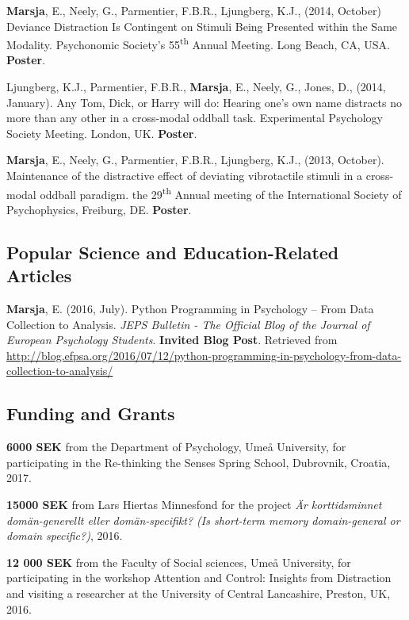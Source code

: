 \documentclass[]{article}
\begin{document}
\textbf{Marsja}, E., Neely, G., Parmentier, F.B.R., Ljungberg, K.J.,
(2014, October) Deviance Distraction Is Contingent on Stimuli Being
Presented within the Same Modality. Psychonomic Society's
55\textsuperscript{th} Annual Meeting. Long Beach, CA, USA.
\textbf{Poster}.

Ljungberg, K.J., Parmentier, F.B.R., \textbf{Marsja}, E., Neely, G.,
Jones, D., (2014, January). Any Tom, Dick, or Harry will do: Hearing
one's own name distracts no more than any other in a cross-modal oddball
task. Experimental Psychology Society Meeting. London, UK.
\textbf{Poster}.

\textbf{Marsja}, E., Neely, G., Parmentier, F.B.R., Ljungberg, K.J.,
(2013, October). Maintenance of the distractive effect of deviating
vibrotactile stimuli in a cross-modal oddball paradigm. the
29\textsuperscript{th} Annual meeting of the International Society of
Psychophysics, Freiburg, DE. \textbf{Poster}.

\subsection{Popular Science and Education-Related
Articles}\label{popular-science-and-education-related-articles}

\textbf{Marsja}, E. (2016, July). Python Programming in Psychology --
From Data Collection to Analysis. \emph{JEPS Bulletin - The Official
Blog of the Journal of European Psychology Students}. \textbf{Invited
Blog Post}. Retrieved from \sloppy
\url{http://blog.efpsa.org/2016/07/12/python-programming-in-psychology-from-data-collection-to-analysis/}

\subsection{Funding and Grants}\label{funding-and-grants}

\textbf{6000 SEK} from the Department of Psychology, Umeå University,
for participating in the Re-thinking the Senses Spring School,
Dubrovnik, Croatia, 2017.

\textbf{15000 SEK} from Lars Hiertas Minnesfond for the project \emph{Är
korttidsminnet domän-generellt eller domän-specifikt? (Is short-term
memory domain-general or domain specific?)}, 2016.

\textbf{12 000 SEK} from the Faculty of Social sciences, Umeå
University, for participating in the workshop Attention and Control:
Insights from Distraction and visiting a researcher at the University of
Central Lancashire, Preston, UK, 2016.
\end{document}
